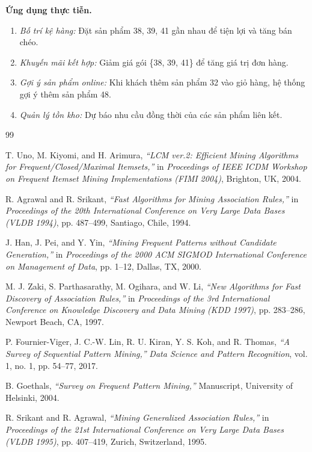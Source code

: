 \documentclass[12pt,a4paper]{article}
\theoremstyle{definition}
\begin{document}
\textbf{Ứng dụng thực tiễn.}
\begin{enumerate}
    \item \textit{Bố trí kệ hàng:} Đặt sản phẩm 38, 39, 41 gần nhau để tiện lợi và tăng bán chéo.
    \item \textit{Khuyến mãi kết hợp:} Giảm giá gói \{38, 39, 41\} để tăng giá trị đơn hàng.
    \item \textit{Gợi ý sản phẩm online:} Khi khách thêm sản phẩm 32 vào giỏ hàng, hệ thống gợi ý thêm sản phẩm 48.
    \item \textit{Quản lý tồn kho:} Dự báo nhu cầu đồng thời của các sản phẩm liên kết.
\end{enumerate}


\newpage
\begin{thebibliography}{99}

T. Uno, M. Kiyomi, and H. Arimura,
\textit{``LCM ver.2: Efficient Mining Algorithms for Frequent/Closed/Maximal Itemsets,''}
in \textit{Proceedings of IEEE ICDM Workshop on Frequent Itemset Mining Implementations (FIMI 2004)},
Brighton, UK, 2004.

R. Agrawal and R. Srikant,
\textit{``Fast Algorithms for Mining Association Rules,''}
in \textit{Proceedings of the 20th International Conference on Very Large Data Bases (VLDB 1994)},
pp. 487--499, Santiago, Chile, 1994.

J. Han, J. Pei, and Y. Yin,
\textit{``Mining Frequent Patterns without Candidate Generation,''}
in \textit{Proceedings of the 2000 ACM SIGMOD International Conference on Management of Data},
pp. 1--12, Dallas, TX, 2000.

M. J. Zaki, S. Parthasarathy, M. Ogihara, and W. Li,
\textit{``New Algorithms for Fast Discovery of Association Rules,''}
in \textit{Proceedings of the 3rd International Conference on Knowledge Discovery and Data Mining (KDD 1997)},
pp. 283--286, Newport Beach, CA, 1997.

P. Fournier-Viger, J. C.-W. Lin, R. U. Kiran, Y. S. Koh, and R. Thomas,
\textit{``A Survey of Sequential Pattern Mining,''}
\textit{Data Science and Pattern Recognition}, vol. 1, no. 1, pp. 54--77, 2017.

B. Goethals,
\textit{``Survey on Frequent Pattern Mining,''}
Manuscript, University of Helsinki, 2004.

R. Srikant and R. Agrawal,
\textit{``Mining Generalized Association Rules,''}
in \textit{Proceedings of the 21st International Conference on Very Large Data Bases (VLDB 1995)},
pp. 407--419, Zurich, Switzerland, 1995.

\end{thebibliography}
\end{document}
